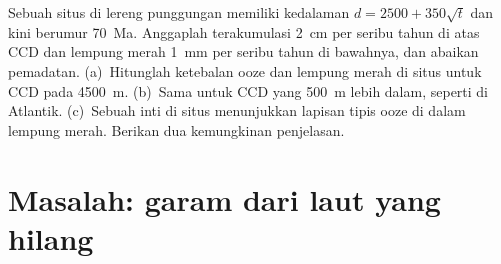\begin{exercise}[$\star\star\star$]\label{exo:b1:chemical-biogenic-sediments:12}
Sebuah situs di lereng punggungan memiliki kedalaman $d = 2500 + 350\sqrt t$ dan kini berumur \qty{70}{Ma}. Anggaplah  terakumulasi \qty{2}{cm} per seribu tahun di atas CCD dan lempung merah \qty{1}{mm} per seribu tahun di bawahnya, dan abaikan pemadatan. (a)~Hitunglah ketebalan ooze dan lempung merah di situs untuk CCD pada \qty{4500}{m}. (b)~Sama untuk CCD yang \qty{500}{m} lebih dalam, seperti di Atlantik. (c)~Sebuah inti di situs menunjukkan lapisan tipis ooze di dalam lempung merah. Berikan dua kemungkinan penjelasan.
\end{exercise}

\section{Masalah: garam dari laut yang hilang}

